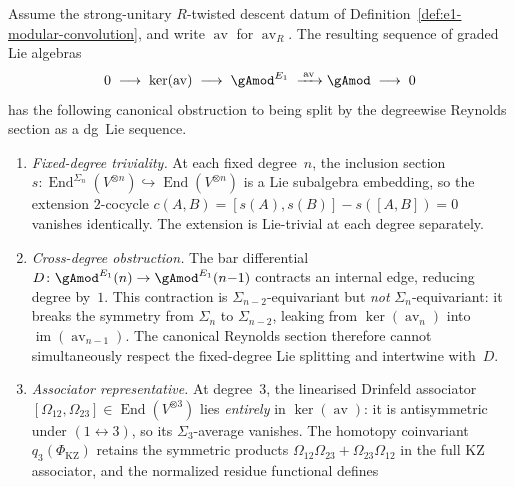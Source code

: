 \begin{proposition}
\label{prop:e1-nonsplitting-obstruction}
Assume the strong-unitary $R$-twisted descent datum of
Definition~\textup{\ref{def:e1-modular-convolution}}, and write
$\operatorname{av}$ for $\operatorname{av}_R$.  The resulting
sequence of graded Lie algebras
\begin{equation}
\label{eq:e1-nonsplitting-ses}
0
\;\longrightarrow\;
\ker(\operatorname{av})
\;\longrightarrow\;
{\gAmod}^{E_1}
\;\xrightarrow{\;\operatorname{av}\;}
\gAmod
\;\longrightarrow\;
0
\end{equation}
has the following canonical obstruction to being split by the
degreewise Reynolds section as a dg~Lie sequence.
\begin{enumerate}[label=\textup{(\roman*)}]
\item \emph{Fixed-degree triviality.}
 At each fixed degree~$n$, the inclusion section
 $s\colon \operatorname{End}^{\Sigma_n}(V^{\otimes n})
 \hookrightarrow \operatorname{End}(V^{\otimes n})$
 is a Lie subalgebra embedding, so the extension $2$-cocycle
 $c(A,B) = [s(A), s(B)] - s([A,B]) = 0$
 vanishes identically. The extension is Lie-trivial at
 each degree separately.
\item \emph{Cross-degree obstruction.}
 The bar differential $D\colon {\gAmod}^{E_1}(n) \to
 {\gAmod}^{E_1}(n{-}1)$ contracts an internal edge, reducing
 degree by~$1$. This contraction is $\Sigma_{n-2}$-equivariant
 but \emph{not} $\Sigma_n$-equivariant: it breaks the symmetry
 from $\Sigma_n$ to $\Sigma_{n-2}$, leaking from
 $\ker(\operatorname{av}_n)$ into
 $\operatorname{im}(\operatorname{av}_{n-1})$.
 The canonical Reynolds section therefore cannot simultaneously
 respect the fixed-degree Lie splitting and intertwine with~$D$.
\item \emph{Associator representative.}
 At degree~$3$, the linearised Drinfeld associator
 $[\Omega_{12}, \Omega_{23}] \in \operatorname{End}(V^{\otimes 3})$
 lies \emph{entirely} in $\ker(\operatorname{av})$: it is
 antisymmetric under $(1 \leftrightarrow 3)$, so its
 $\Sigma_3$-average vanishes.  The homotopy coinvariant
 $q_3(\Phi_{\mathrm{KZ}})$ retains the symmetric products
 $\Omega_{12}\Omega_{23}+\Omega_{23}\Omega_{12}$ in the full KZ
 associator, and the normalized residue functional defines

\end{enumerate}
\end{proposition}
